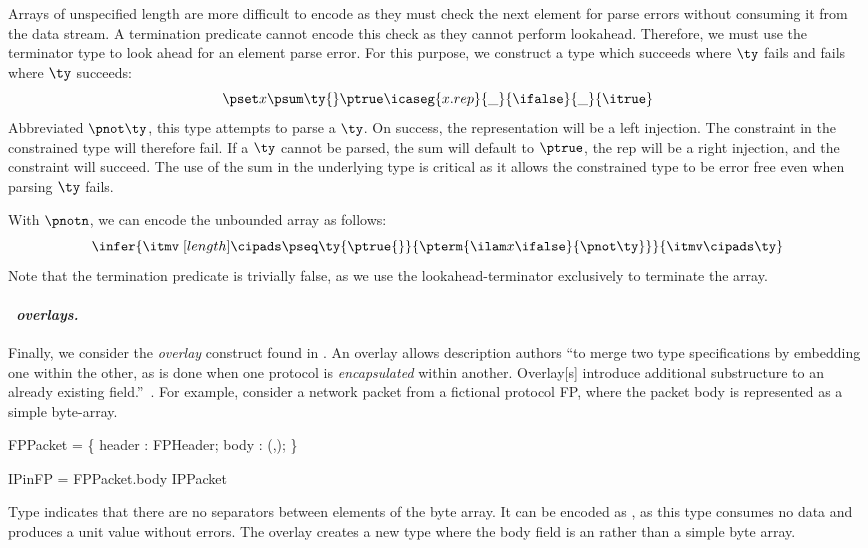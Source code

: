 Arrays of unspecified length are more difficult to encode as they must
check the next element for parse errors without consuming it from the
data stream. A termination predicate cannot encode this check as they
cannot perform lookahead. Therefore, we must use the terminator type
to look ahead for an element parse error. For this purpose, we
construct a type which succeeds where $\ty$ fails and fails where
$\ty$ succeeds:
\[
\pset x {\psum \ty {} \ptrue} {\icaseg {x.rep} {\_}
  {\ifalse} {\_} {\itrue}}
\]
\noindent
Abbreviated $\pnot \ty$, this type attempts to parse a $\ty$. On
success, the representation will be a left injection. The constraint
in the constrained type will therefore fail. If a $\ty$ cannot be
parsed, the sum will default to $\ptrue$, the rep will be a right
injection, and the constraint will succeed. The use of the sum in the
underlying type is critical as it allows the constrained type to be
error free even when parsing $\ty$ fails.

With $\pnotn$, we can encode the unbounded \datascript{} array as
follows:
\[
  \infer{
    \itmv \; [{length}] \cipads 
    \pseq \ty {\ptrue{}} {\pterm {\ilam x {} \ifalse} {\pnot \ty}}
  }{ 
    \itmv \cipads \ty
  }
\]
Note that the termination predicate is trivially false, as we use the
lookahead-terminator exclusively to terminate the array. 

\paragraph{\em \packettypes\ overlays.}
Finally, we consider the {\it overlay} construct found in
\packettypes{}.  An overlay allows description authors ``to merge two
type specifications by embedding one within the other, as is done when
one protocol is {\it encapsulated} within another. Overlay[s]
introduce additional substructure to an already existing
field.''~\cite{sigcomm00}.  For example, consider a network packet
from a fictional protocol FP, where the packet body is represented as
a simple byte-array.
\begin{code}
FPPacket = \Pstruct \{
  header : FPHeader;
  body   : \Pbyte \Parray{}(\Pnosep,\Peof);
\}

IPinFP = \Poverlay FPPacket.body \Pwith IPPacket
\end{code}
Type \Pnosep{} indicates that there are no separators between elements
of the byte array. It can be encoded as , as
this type consumes no data and produces a unit value without errors.
The overlay creates a new type  where the body field is an
 rather than a simple byte array.

